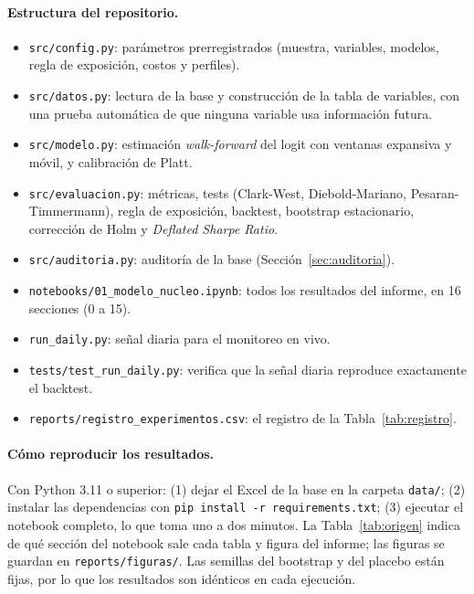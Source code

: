 \documentclass[11pt,a4paper]{article}
\begin{document}
\paragraph{Estructura del repositorio.}
\begin{itemize}\itemsep1pt
\item \texttt{src/config.py}: parámetros prerregistrados (muestra, variables, modelos, regla de exposición, costos y perfiles).
\item \texttt{src/datos.py}: lectura de la base y construcción de la tabla de variables, con una prueba automática de que ninguna variable usa información futura.
\item \texttt{src/modelo.py}: estimación \emph{walk-forward} del logit con ventanas expansiva y móvil, y calibración de Platt.
\item \texttt{src/evaluacion.py}: métricas, tests (Clark-West, Diebold-Mariano, Pesaran-Timmermann), regla de exposición, backtest, bootstrap estacionario, corrección de Holm y \emph{Deflated Sharpe Ratio}.
\item \texttt{src/auditoria.py}: auditoría de la base (Sección~\ref{sec:auditoria}).
\item \texttt{notebooks/01\_modelo\_nucleo.ipynb}: todos los resultados del informe, en 16 secciones (0 a 15).
\item \texttt{run\_daily.py}: señal diaria para el monitoreo en vivo.
\item \texttt{tests/test\_run\_daily.py}: verifica que la señal diaria reproduce exactamente el backtest.
\item \texttt{reports/registro\_experimentos.csv}: el registro de la Tabla~\ref{tab:registro}.
\end{itemize}

\paragraph{Cómo reproducir los resultados.} Con Python 3.11 o superior: (1) dejar el Excel de la base en la carpeta \texttt{data/}; (2) instalar las dependencias con \texttt{pip install -r requirements.txt}; (3) ejecutar el notebook completo, lo que toma uno a dos minutos. La Tabla~\ref{tab:origen} indica de qué sección del notebook sale cada tabla y figura del informe; las figuras se guardan en \texttt{reports/figuras/}. Las semillas del bootstrap y del placebo están fijas, por lo que los resultados son idénticos en cada ejecución.
\end{document}
